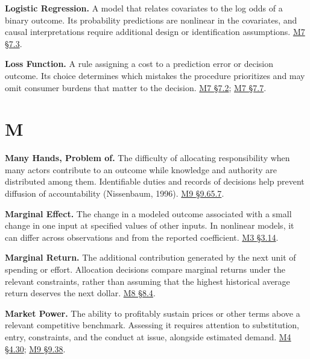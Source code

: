\noindent\textbf{Logistic Regression.} A model that relates covariates to the log
odds of a binary outcome. Its probability predictions are nonlinear in
the covariates, and causal interpretations require additional design or
identification assumptions.
\href{Marketing_Analytics_Lecture_Notes.pdf\#M07-logistic-regression-trees-and-ensembles}{M7
§7.3}.

\noindent\textbf{Loss Function.} A rule assigning a cost to a prediction error or
decision outcome. Its choice determines which mistakes the procedure
prioritizes and may omit consumer burdens that matter to the decision.
\href{Marketing_Analytics_Lecture_Notes.pdf\#M07-baselines-loss-functions-and-regularization}{M7
§7.2};
\href{Marketing_Analytics_Lecture_Notes.pdf\#M07-thresholds-should-reflect-the-decision}{M7
§7.7}.

\par{}
\hypertarget{module-m}{%
\section*{M}\label{module-m}}

\noindent\textbf{Many Hands, Problem of.} The difficulty of allocating
responsibility when many actors contribute to an outcome while knowledge
and authority are distributed among them. Identifiable duties and
records of decisions help prevent diffusion of accountability
(Nissenbaum, 1996).
\hyperref[M09-responsibility-for-the-artifact-and-its-uses]{M9
§9.65.7}.

\noindent\textbf{Marginal Effect.} The change in a modeled outcome associated
with a small change in one input at specified values of other inputs. In
nonlinear models, it can differ across observations and from the
reported coefficient.
\href{Marketing_Analytics_Lecture_Notes.pdf\#M03-a-linear-coefficient-and-a-nonlinear-decision}{M3
§3.14}.

\noindent\textbf{Marginal Return.} The additional contribution generated by the
next unit of spending or effort. Allocation decisions compare marginal
returns under the relevant constraints, rather than assuming that the
highest historical average return deserves the next dollar.
\href{Marketing_Analytics_Lecture_Notes.pdf\#M08-case-study-allocate-the-next-dollar-using-marginal-returns}{M8
§8.4}.

\noindent\textbf{Market Power.} The ability to profitably sustain prices or other
terms above a relevant competitive benchmark. Assessing it requires
attention to substitution, entry, constraints, and the conduct at issue,
alongside estimated demand.
\href{Marketing_Analytics_Lecture_Notes.pdf\#M04-heterogeneous-demand-market-power-and-consumer-interests}{M4
§4.30};
\hyperref[M09-pricing-evidence-in-a-u.s.-antitrust-case]{M9
§9.38}.

